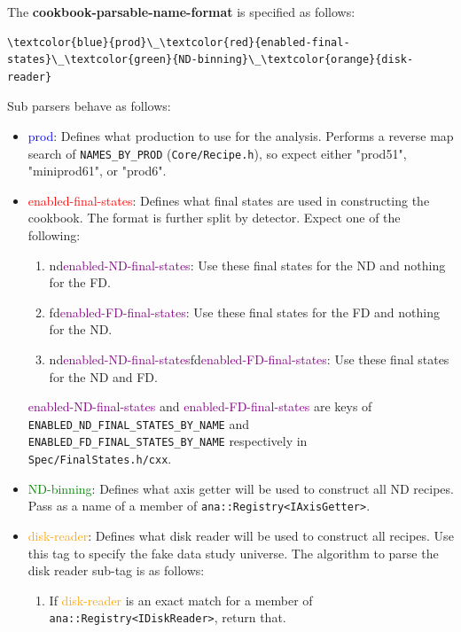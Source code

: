 \documentclass{article}
\begin{document}
The \textbf{cookbook-parsable-name-format} is specified as follows:
\begin{Verbatim}[commandchars=\\\{\}]
    \textcolor{blue}{prod}\_\textcolor{red}{enabled-final-states}\_\textcolor{green}{ND-binning}\_\textcolor{orange}{disk-reader}
\end{Verbatim}
Sub parsers behave as follows:
\begin{itemize}
    \item \textcolor{blue}{prod}: Defines what production to use for the analysis. Performs a reverse map search of \texttt{NAMES\_\-BY\_\-PROD} (\texttt{Core/\-Recipe.h}), so expect either "prod51", "miniprod61", or "prod6".
    \item \textcolor{red}{enabled-final-states}: Defines what final states are used in constructing the cookbook. The format is further split by detector. Expect one of the following:
    \begin{enumerate}
        \item nd\textcolor{purple}{enabled-ND-final-states}: Use these final states for the ND and nothing for the FD.
        \item fd\textcolor{purple}{enabled-FD-final-states}: Use these final states for the FD and nothing for the ND.
        \item nd\textcolor{purple}{enabled-ND-final-states}fd\textcolor{purple}{enabled-FD-final-states}: Use these final states for the ND and FD.
    \end{enumerate}
    \textcolor{purple}{enabled-ND-final-states} and \textcolor{purple}{enabled-FD-final-states} are keys of \texttt{ENABLED\_\-ND\_\-FINAL\_\-STATES\_\-BY\_\-NAME} and \\\texttt{ENABLED\_\-FD\_\-FINAL\_\-STATES\_\-BY\_\-NAME} respectively in \texttt{Spec/\-FinalStates\-.h/cxx}.
    \item \textcolor{green}{ND-binning}: Defines what axis getter will be used to construct all ND recipes. Pass as a name of a member of \texttt{ana::Registry<IAxisGetter>}.
    \item \textcolor{orange}{disk-reader}: Defines what disk reader will be used to construct all recipes. Use this tag to specify the fake data study universe. The algorithm to parse the disk reader sub-tag is as follows:
    \begin{enumerate}
        \item If \textcolor{orange}{disk-reader} is an exact match for a member of \texttt{ana::Registry<IDiskReader>}, return that.

\end{enumerate}
\end{itemize}
\end{document}
